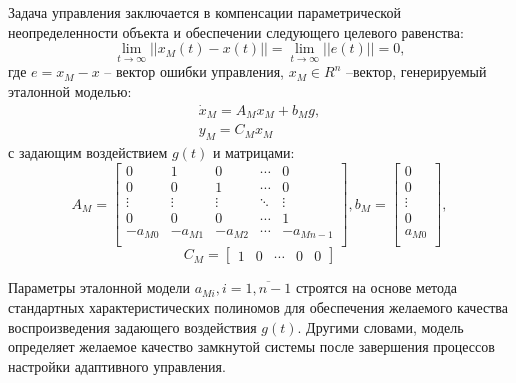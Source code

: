 \documentclass[14pt, a4paper]{extarticle}
\begin{document}
	Задача управления заключается в компенсации параметрической неопределенности объекта и обеспечении следующего целевого равенства:
	$$\lim\limits_{t\to\infty}\left|\left|x_M(t)-x(t)\right|\right|=\lim\limits_{t\to\infty}\left|\left|e(t)\right|\right|=0,$$
	где $e=x_M-x$ -- вектор ошибки управления, $x_M\in R^n$ --вектор, генерируемый эталонной моделью:
	$$\begin{matrix}
		\dot{x}_M = A_Mx_M + b_Mg,\\
		y_M = C_Mx_M
	\end{matrix}$$
	с задающим воздействием $g(t)$ и матрицами:
	$$A_M=\left[\begin{matrix}
		0 & 1 & 0 & \cdots & 0 \\
		0 & 0 & 1 & \cdots & 0 \\
		\vdots & \vdots & \vdots & \ddots & \vdots \\
		0 & 0 & 0 & \cdots & 1 \\
		-a_{M0} & -a_{M1} & -a_{M2} & \cdots & -a_{Mn-1} \\
	\end{matrix}\right], b_M = \left[\begin{matrix}
		0 \\ 0 \\ \vdots \\ 0 \\ a_{M0} \\
	\end{matrix}\right],$$
	$$C_M = \left[\begin{matrix}
		1 & 0 & \cdots & 0 & 0
	\end{matrix}\right]$$

	Параметры эталонной модели $a_{Mi},i=\overline{1,n-1}$ строятся на основе метода стандартных характеристических полиномов для обеспечения желаемого качества воспроизведения задающего воздействия $g(t)$. Другими словами, модель определяет желаемое качество замкнутой системы после завершения процессов настройки адаптивного управления.
\end{document}
